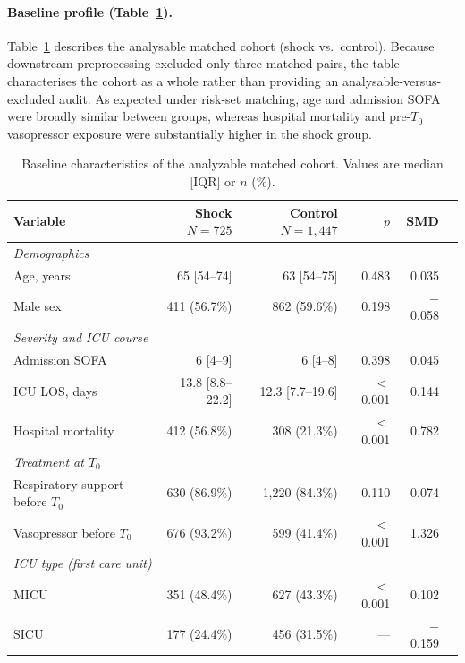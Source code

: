 \documentclass[referee,lineno,pdflatex]{sn-article-template/sn-jnl}
\begin{document}
\paragraph{Baseline profile (Table~\ref{tab:table1}).}
Table~\ref{tab:table1} describes the analysable matched cohort (shock vs.\ control).
Because downstream preprocessing excluded only three matched pairs, the table characterises
the cohort as a whole rather than providing an analysable-versus-excluded audit.
As expected under risk-set matching, age and admission SOFA were broadly similar between
groups, whereas hospital mortality and pre-$T_0$ vasopressor exposure were substantially
higher in the shock group.

\begin{table}[ht]
\centering
\caption{%
  Baseline characteristics of the analyzable matched cohort.
  Values are median [IQR] or $n$ (\%).%
}
\label{tab:table1}
\begin{tabular}{lrrrrr}
\toprule
Variable &
  \makecell{Shock\\$N=725$} &
  \makecell{Control\\$N=1{,}447$} &
  $p$ & SMD \\
\midrule
\multicolumn{5}{l}{\textit{Demographics}} \\
Age, years            & 65 [54--74] & 63 [54--75] & 0.483 & 0.035 \\
Male sex              & 411 (56.7\%) & 862 (59.6\%) & 0.198 & $-$0.058 \\
\midrule
\multicolumn{5}{l}{\textit{Severity and ICU course}} \\
Admission SOFA        & 6 [4--9] & 6 [4--8] & 0.398 & 0.045 \\
ICU LOS, days         & 13.8 [8.8--22.2] & 12.3 [7.7--19.6] & $<$0.001 & 0.144 \\
Hospital mortality    & 412 (56.8\%) & 308 (21.3\%) & $<$0.001 & 0.782 \\
\midrule
\multicolumn{5}{l}{\textit{Treatment at $T_0$}} \\
Respiratory support before $T_0$ & 630 (86.9\%) & 1,220 (84.3\%) & 0.110 & 0.074 \\
Vasopressor before $T_0$ & 676 (93.2\%) & 599 (41.4\%) & $<$0.001 & 1.326 \\
\midrule
\multicolumn{5}{l}{\textit{ICU type (first care unit)}} \\
MICU                  & 351 (48.4\%) & 627 (43.3\%) & $<$0.001 & 0.102 \\
SICU                  & 177 (24.4\%) & 456 (31.5\%) & --- & $-$0.159 \\

\end{tabular}
\end{table}
\end{document}
